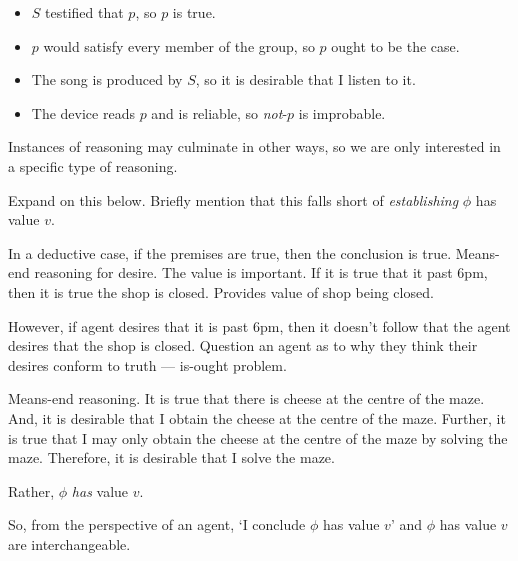 \begin{note}
  \begin{itemize}
  \item \(S\) testified that \(p\), so \(p\) is true.
  \item \(p\) would satisfy every member of the group, so \(p\) ought to be the case.
  \item The song is produced by \(S\), so it is desirable that I listen to it.
  \item The device reads \(p\) and is reliable, so \emph{not}-\(p\) is improbable.
  \end{itemize}
\end{note}

\begin{note}
  Instances of reasoning may culminate in other ways, so we are only interested in a specific type of reasoning.
\end{note}

\begin{note}
  Expand on this below.
  Briefly mention that this falls short of \emph{establishing} \(\phi\) has value \(v\).
\end{note}

\begin{note}
  In a deductive case, if the premises are true, then the conclusion is true.
  Means-end reasoning for desire.
  The value is important.
  If it is true that it past 6pm, then it is true the shop is closed.
  Provides value of shop being closed.

  However, if agent desires that it is past 6pm, then it doesn't follow that the agent desires that the shop is closed.
  Question an agent as to why they think their desires conform to truth --- is-ought problem.

  Means-end reasoning.
  It is true that there is cheese at the centre of the maze.
  And, it is desirable that I obtain the cheese at the centre of the maze.
  Further, it is true that I may only obtain the cheese at the centre of the maze by solving the maze.
  Therefore, it is desirable that I solve the maze.
\end{note}

\begin{note}[`Concluding']
  Rather, \(\phi\) \emph{has} value \(v\).

  So, from the perspective of an agent, `I conclude \(\phi\) has value \(v\)' and \(\phi\) has value \(v\) are interchangeable.
\end{note}

